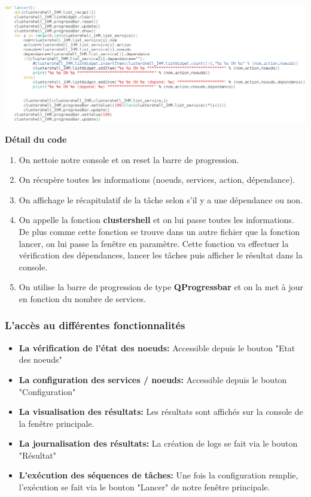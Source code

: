 \documentclass[a4paper,11pt]{article}
\begin{document}
\includegraphics[scale=0.45]{def_lancer.png} 

\textbf{Détail du code}\\
\begin{enumerate}
\item On nettoie notre console et on reset la barre de progression.
\item On récupère toutes les informations (noeuds, services, action, dépendance).
\item On affichage le récapitulatif de la tâche selon s'il y a une dépendance ou non.
\item On appelle la fonction \textbf{clustershell} et on lui passe toutes les informations. De plus comme cette fonction se trouve dans un autre fichier que la fonction lancer, on lui passe la fenêtre en paramètre. Cette fonction va effectuer la vérification des dépendances, lancer les tâches puis afficher le résultat dans la console.
\item On utilise la barre de progression de type \textbf{QProgressbar} et on la met à jour en fonction du nombre de services.
\end{enumerate}

\subsubsection{L'accès au différentes fonctionnalités}

\begin{itemize}
\item \textbf{La vérification de l'état des noeuds:} Accessible depuis le bouton "Etat des noeuds"
\item \textbf{La configuration des services / noeuds:} Accessible depuis le bouton "Configuration"
\item \textbf{La visualisation des résultats:} Les résultats sont affichés sur la console de la fenêtre principale.
\item \textbf{La journalisation des résultats:} La création de logs se fait via le bouton "Résultat"
\item \textbf{L'exécution des séquences de tâches:} Une fois la configuration remplie, l'exécution se fait via le bouton "Lancer" de notre fenêtre principale.
\end{itemize}
\end{document}
